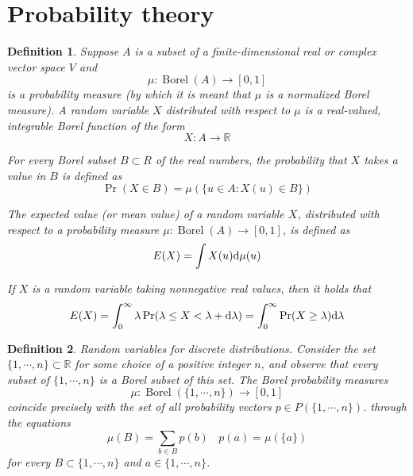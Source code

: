 \documentclass[aps,pra,onecolumn,notitlepage,superscriptaddress]{revtex4-1}
\newcommand{\R}{\mathbb{R}}
\def\d{{\rm d}}
\newcommand{\op}[1]{\operatorname{#1}}
\newtheorem{defi}{Definition}
\begin{document}
    \section{Probability theory}
    \begin{defi}
        Suppose $A$ is a subset of a finite-dimensional real or complex vector space $V$ and  
        \begin{equation}
            \mu : \op{Borel}(A) \to [0,1]
        \end{equation}
        is a probability measure (by which it is meant that $\mu$ is a normalized Borel measure). A random variable $X$ distributed with respect to $\mu$ is a real-valued, integrable Borel function of the form
        \begin{equation}
            X : A \to \R
        \end{equation}

        For every Borel subset $B \subset R$ of the real numbers, the probability that $X$ takes a value in $B$ is defined as
        \begin{equation}
            \op{Pr}(X \in B) = \mu( \{ u \in A : X(u) \in B \} )
        \end{equation}

        The expected value (or mean value) of a random variable $X$, distributed with respect to a probability measure $\mu : \op{Borel}(A) \to [0,1]$, is defined as
        \begin{equation}
            E(X) = \int X(u) \d \mu(u)
        \end{equation}

        If $X$ is a random variable taking nonnegative real values, then it holds that
        \begin{equation}
            E(X) = \int_0^\infty \lambda \op{Pr}(\lambda \leq X < \lambda + \d \lambda) = \int_0^{\infty} \op{Pr}(X \geq \lambda) \d \lambda
        \end{equation}
    \end{defi}

    \begin{defi}
        Random variables for discrete distributions. Consider the set $\{ 1,\cdots,n \} \subset \R$ for some choice of a positive integer $n$, and observe that every subset of $\{ 1,\cdots,n \}$ is a Borel subset of this set. The Borel probability measures
        \begin{equation}
            \mu : \op{Borel}(\{ 1,\cdots,n \}) \to [0,1]
        \end{equation}
        coincide precisely with the set of all probability vectors $p \in P(\{1, \cdots, n\})$. through the equations
        \begin{equation}
            \mu(B) = \sum_{b \in B}p(b) \ \ \ \ p(a) = \mu(\{a\})
        \end{equation}
        for every $B \subset \{1, \cdots, n\}$ and $a \in \{1,\cdots,n\}$.
    \end{defi}
\end{document}
